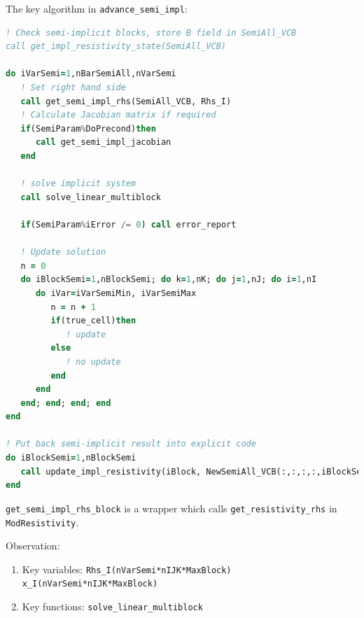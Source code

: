 \documentclass[11pt]{book} %
\begin{document}
The key algorithm in \verb|advance_semi_impl|: 
\begin{lstlisting}[language=Fortran, caption=Semi-implicit scheme]
! Check semi-implicit blocks, store B field in SemiAll_VCB
call get_impl_resistivity_state(SemiAll_VCB)

do iVarSemi=1,nBarSemiAll,nVarSemi
   ! Set right hand side
   call get_semi_impl_rhs(SemiAll_VCB, Rhs_I)
   ! Calculate Jacobian matrix if required
   if(SemiParam%DoPrecond)then
      call get_semi_impl_jacobian
   end
   
   ! solve implicit system
   call solve_linear_multiblock
   
   if(SemiParam%iError /= 0) call error_report
   
   ! Update solution
   n = 0
   do iBlockSemi=1,nBlockSemi; do k=1,nK; do j=1,nJ; do i=1,nI
      do iVar=iVarSemiMin, iVarSemiMax
         n = n + 1
         if(true_cell)then
            ! update
         else
            ! no update
         end
      end
   end; end; end; end
end
   
! Put back semi-implicit result into explicit code
do iBlockSemi=1,nBlockSemi
   call update_impl_resistivity(iBlock, NewSemiAll_VCB(:,:,:,:,iBlockSemi))
end
\end{lstlisting}

\verb|get_semi_impl_rhs_block| is a wrapper which calls \verb|get_resistivity_rhs| in \verb|ModResistivity|.

Observation:
\begin{enumerate}
\item Key variables:
\subitem \verb|Rhs_I(nVarSemi*nIJK*MaxBlock)|
\subitem \verb|x_I(nVarSemi*nIJK*MaxBlock)|
\item Key functions:
\subitem \verb|solve_linear_multiblock|
\end{enumerate}
\end{document}
